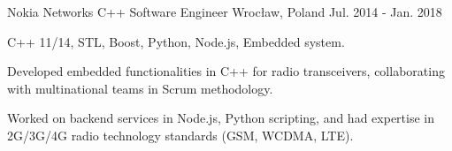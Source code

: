 \begin{cventries}
  \cventry
    {Nokia Networks} %
    {C++ Software Engineer} %
    {Wrocław, Poland} %
    {Jul. 2014 - Jan. 2018} %
    {
        \begin{cvitems} %
            \item {C++ 11/14, STL, Boost, Python, Node.js, Embedded system.}
            \item {Developed embedded functionalities in C++ for radio transceivers, collaborating with multinational teams in Scrum methodology.}
            \item {Worked on backend services in Node.js, Python scripting, and had expertise in 2G/3G/4G radio technology standards (GSM, WCDMA, LTE).}
        \end{cvitems}
    }

\end{cventries}
